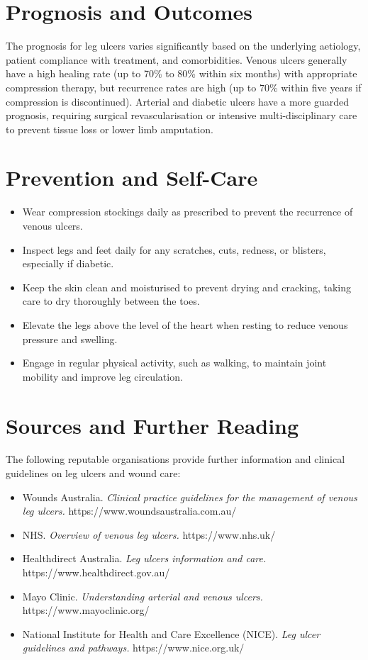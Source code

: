 \section*{Prognosis and Outcomes}
The prognosis for leg ulcers varies significantly based on the underlying aetiology, patient compliance with treatment, and comorbidities. Venous ulcers generally have a high healing rate (up to 70\% to 80\% within six months) with appropriate compression therapy, but recurrence rates are high (up to 70\% within five years if compression is discontinued). Arterial and diabetic ulcers have a more guarded prognosis, requiring surgical revascularisation or intensive multi-disciplinary care to prevent tissue loss or lower limb amputation.

\section*{Prevention and Self-Care}
\begin{itemize}
    \item Wear compression stockings daily as prescribed to prevent the recurrence of venous ulcers.
    \item Inspect legs and feet daily for any scratches, cuts, redness, or blisters, especially if diabetic.
    \item Keep the skin clean and moisturised to prevent drying and cracking, taking care to dry thoroughly between the toes.
    \item Elevate the legs above the level of the heart when resting to reduce venous pressure and swelling.
    \item Engage in regular physical activity, such as walking, to maintain joint mobility and improve leg circulation.
\end{itemize}

\section*{Sources and Further Reading}
The following reputable organisations provide further information and clinical guidelines on leg ulcers and wound care:
\begin{itemize}
    \item Wounds Australia. \textit{Clinical practice guidelines for the management of venous leg ulcers.} https://www.woundsaustralia.com.au/
    \item NHS. \textit{Overview of venous leg ulcers.} https://www.nhs.uk/
    \item Healthdirect Australia. \textit{Leg ulcers information and care.} https://www.healthdirect.gov.au/
    \item Mayo Clinic. \textit{Understanding arterial and venous ulcers.} https://www.mayoclinic.org/
    \item National Institute for Health and Care Excellence (NICE). \textit{Leg ulcer guidelines and pathways.} https://www.nice.org.uk/
\end{itemize}
